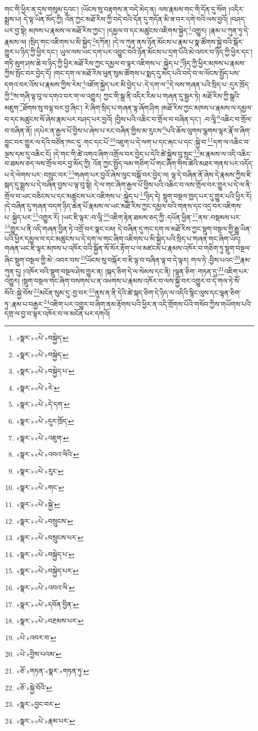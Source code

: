 གང་གི་ཕྱིར་ན་དུས་གསུམ་དུའང་། །ཡོངས་སུ་བརྟགས་ན་བདེ་མེད་ན། ལས་རྣམས་གང་གི་དོན་དུ་སོག །འདིར་སྨྲས་པ། དེ་ལྟ་ཡིན་མོད་ཀྱི། འོན་ཀྱང་མཐོ་རིས་ཀྱི་བདེ་བའི་དོན་དུ་གདོན་མི་ཟ་བར་དགེ་བའི་ལས་བྱའོ། །བཤད་པར་བྱ་སྟེ། མཁས་པ་རྣམས་ལ་མཐོ་རིས་ཀྱང་། །དམྱལ་བ་དང་མཚུངས་འཇིགས་སྐྱེད་\footnote{«སྣར་»«པེ་»བསྐྱེད་}འགྱུར། །རྣམ་པ་ཀུན་ཏུ་དེ་རྣམས་ལ། །སྲིད་གང་འཇིགས་པ་མི་སྐྱེད་\footnote{«སྣར་»«པེ་»བསྐྱེད་}དཀོན། །དེ་ལ་ཀུན་ནས་ཉོན་མོངས་པ་རྣམ་པ་སྣ་ཚོགས་སྐྱེ་བའི་སྒོར་གྱུར་པ་ཉིད་ཀྱི་ཕྱིར་དང་། ཡུལ་ལས་ཡང་དག་པར་འབྱུང་བའི་ཉོན་མོངས་པ་དྲག་པོའི་མེ་འབར་བ་ཉིད་ཀྱི་ཕྱིར་དང་། གཏི་མུག་ཤས་ཆེ་བ་ཉིད་ཀྱི་ཕྱིར་མཐོ་རིས་ཀྱང་དམྱལ་བ་ལྟར་འཇིགས་པ་:སྐྱེད་པ་\footnote{«སྣར་»«པེ་»བསྐྱེད་པ་}ཉིད་ཀྱི་ཕྱིར་མཁས་པ་རྣམས་ཀྱིས་སྤོང་བར་བྱེད་དོ། །གང་དག་ལ་མཐོ་རིས་ཕུན་སུམ་ཚོགས་པ་སྨད་དུ་མེད་པའི་བདེ་བ་ལ་ལོངས་སྤྱོད་པས་དགའ་བར་འོས་པ་རྣམས་ཀྱིས་རེས་\footnote{«སྣར་»«པེ་»རེ་}འཇོག་སྐྱེད་པར་མི་བྱེད་པ་:དེ་དག་ལ་\footnote{«སྣར་»«པེ་»དེ་དག་}དེ་ལས་གཞན་པའི་སྲིད་པ་:དུར་ཁྲོད་ཀྱི་\footnote{«སྣར་»«པེ་»དུར་ཁྲོད་}ས་གཞི་ལྟ་བུ་ལ་དགའ་བར་ག་ལ་འགྱུར། ཀྱང་གི་སྒྲ་ནི་འདིར་རིམ་པ་གཞན་དུ་སྦྱར་ཏེ། མཐོ་རིས་ཀྱི་སྒྲའི་མཇུག་\footnote{«སྣར་»«པེ་»འཇུག་}ཐོགས་སུ་བལྟ་བར་བྱ་ཞིང་། རེ་ཞིག་སྲིད་པ་གཞན་ལྟ་ཞོག་ཤིག །མཐོ་རིས་ཀྱང་མཁས་པ་རྣམས་ལ་དམྱལ་བ་དང་མཚུངས་སོ་ཞེས་རྣམ་པར་བཤད་པར་བྱའོ། །བྱིས་པའི་འཆིང་བ་གྲོལ་བ་བཞིན་དང་། :བ་ལཱི་\footnote{«སྣར་»«པེ་»འབའ་ལིའི་}འཆིང་བ་གྲོལ་བ་བཞིན་ནོ། །དཔེར་ན་རྒྱལ་པོ་བྱིས་པ་ཞེས་པ་རང་བཞིན་གྱིས་མ་རུངས་\footnote{«སྣར་»«པེ་»རུང་}པའི་ཆོས་ལུགས་ལྕགས་ལྟར་རྣོ་བ་ཞིག་བྱུང་བར་གྱུར་ལ་དེའི་བཙོན་ཁང་དུ་:གང་དང་པོ་\footnote{«སྣར་»«པེ་»གང་}འཇུག་པ་དེ་ལག་པ་དང་རྐང་པ་དང་:སྐྱེ་བ་\footnote{«སྣར་»«པེ་»སྐྱེ་}དག་ལ་འཆིང་བ་ལྔས་དམ་དུ་འཆིང་ངོ། །དེ་གང་གི་ཚེ་འགའ་ཞིག་འགྲོལ་བར་བྱེད་པ་དེའི་ཚེ་སྐྱེས་བུ་སྲུང་\footnote{«སྣར་»«པེ་»བསྲུངས་}མ་རྣམས་ལ་འདི་འཆིང་བ་ཐམས་ཅད་ལས་གྲོལ་བར་བྱ་མོད་ཀྱི། འོན་ཀྱང་སྤྱོད་ལམ་གཅིག་པོ་གང་ཞིག་གིས་ཚེའི་མཐར་གནས་པར་འདོད་པ་དེ་ལེགས་པར་:བསྲུང་བར་\footnote{«སྣར་»«པེ་»བསྲུངས་པར་}གཞག་པར་བྱའོ་ཞེས་ལུང་བསྒོ་བར་བྱེད་ལ། ལྷ་དེ་བཞིན་ནོ་ཞེས་དེ་རྣམས་ཀྱིས་ཇི་སྐད་དུ་སྨྲས་པ་དེ་བཞིན་བྱས་པ་ལྟ་བུ་སྟེ། དེ་ལ་གང་ཞིག་རྒྱལ་པོ་བྱིས་པའི་འཆིང་བ་ལས་གྲོལ་བར་གྱུར་པ་དེ་ལ་ནི་གྲོལ་བ་ཡང་བཅིངས་པ་དང་མཚུངས་པར་འཇིགས་པ་:སྐྱེད་པ་\footnote{«སྣར་»«པེ་»བསྐྱེད་པ་}ཉིད་དེ། སྡུག་བསྔལ་ཁྱད་པར་དུ་གྱུར་པའི་ཕྱིར་རོ། །དེ་བཞིན་དུ་གཞན་བདག་ཉིད་ཆེན་པོ་རྣམས་ལ་ཡང་མཐོ་རིས་ཀྱང་དམྱལ་བའི་གནས་དང་འདྲ་བར་འཇིགས་པ་:སྐྱེད་པར་\footnote{«སྣར་»«པེ་»བསྐྱེད་པར་}འགྱུར་རོ། །ཡང་ཇི་ལྟར་:བ་ལཱི་\footnote{«སྣར་»«པེ་»འབའ་ལི་}འཇིག་རྟེན་ཐམས་ཅད་ཀྱི་:དཔོན་ཕྱིན་\footnote{«སྣར་»«པེ་»དབོན་བྱིན་}ནས་:བསྡམས་པར་\footnote{«སྣར་»«པེ་»བརྔམས་པར་}གྱུར་པ་ནི་འདི་གཞན་བྱིན་ཏེ་འགྲོ་བར་སྣང་ངམ། དེ་བཞིན་དུ་གང་དག་ལ་མཐོ་རིས་ཀྱང་སྡུག་བསྔལ་གྱི་རྒྱུ་ཡིན་པའི་ཕྱིར་དམྱལ་བ་དང་མཚུངས་པ་དེ་དག་ལ་གང་ཞིག་འཇིགས་པ་མི་སྐྱེད་པའི་སྲིད་པ་གཞན་གང་ཞིག་ཡོད། གཞན་ཡང་ཇི་ལྟར་མཁས་པ་འཁོར་བའི་སྐྱོན་སོ་སོར་རྟོག་པ་ལ་མཛངས་པ་རྣམས་འཁོར་བ་གཅིག་ཏུ་སྡུག་བསྔལ་ཞིང་སྡུག་བསྔལ་གྱི་མེ་:འབར་བས་\footnote{«པེ་»འབར་བ་}ཡོངས་སུ་བསྐོར་བ་ཇི་ལྟ་བ་བཞིན་ལྟ་བ་དེ་ལྟར། གལ་ཏེ་:བྱིས་པའང་\footnote{«པེ་»བྱིས་པའམ་}རྣམ་ཀུན་དུ། །འཁོར་བའི་སྡུག་བསྔལ་ཤེས་གྱུར་ན། །སྐད་ཅིག་དེ་ལ་སེམས་དང་ནི། །ལྷན་ཅིག་:གཏན་དུ་\footnote{«ཅོ་»གཏན་«སྣར་»གཏན་ཏུ་}འཇིག་པར་འགྱུར། །སྡུག་བསྔལ་གང་ཞིག་བསགས་པ་ན་འཕགས་པ་རྣམས་འཁོར་བ་ལས་སྐྱོ་བར་འགྱུར་བ་དེ་གལ་ཏེ་སོ་སོའི་:སྐྱེ་བོས་\footnote{«ཅོ་»སྐྱེ་བོའི་}མངོན་སུམ་དུ་:བྱ་བར་\footnote{«སྣར་»བྱང་བར་}ནུས་ན་ནི་དེའི་ཚེ་སྐད་ཅིག་དེ་ཉིད་ལ་འདིའི་སྙིང་ལུས་དང་ལྷན་ཅིག་ཏུ་:རྣམ་པ་བརྒྱར་\footnote{«སྣར་»«པེ་»རྣམ་པར་}འཇིག་པར་འགྱུར་བ་ཞིག་ནམ་རྟོགས་པའི་ཕྱིར་ན་འདི་གྲོགས་པོའི་གསོབ་ཀྱིས་གཡོགས་པའི་དགྲ་ལ་བྱ་བ་ལྟར་འཁོར་བ་ལ་མངོན་པར་དགའོ། 